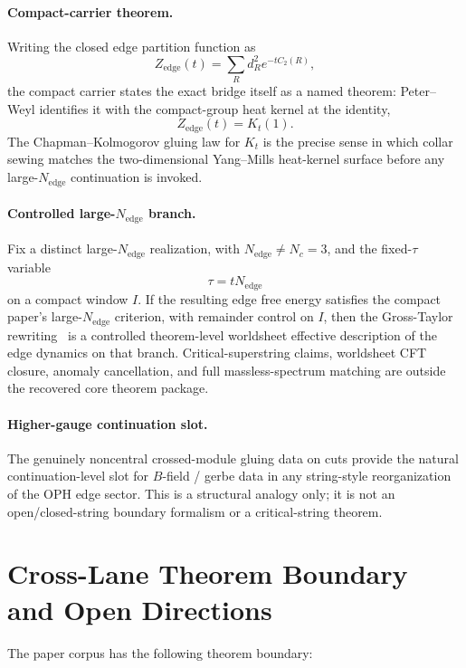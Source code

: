 \paragraph{Compact-carrier theorem.}
Writing the closed edge partition function as
\[
Z_{\mathrm{edge}}(t)=\sum_R d_R^2 e^{-tC_2(R)},
\]
the compact carrier states the exact bridge itself as a named theorem: Peter--Weyl identifies it with the compact-group heat kernel at the identity,
\[
Z_{\mathrm{edge}}(t)=K_t(1).
\]
The Chapman--Kolmogorov gluing law for \(K_t\) is the precise sense in which collar sewing
matches the two-dimensional Yang--Mills heat-kernel surface before any large-\(N_{\mathrm{edge}}\)
continuation is invoked.

\paragraph{Controlled large-\(N_{\mathrm{edge}}\) branch.}
Fix a distinct large-\(N_{\mathrm{edge}}\) realization, with \(N_{\mathrm{edge}}\neq N_c=3\), and
the fixed-\(\tau\) variable
\[
\tau=tN_{\mathrm{edge}}
\]
on a compact window \(I\). If the resulting edge free energy satisfies the compact paper's
large-\(N_{\mathrm{edge}}\) criterion, with remainder control on \(I\), then the Gross-Taylor
rewriting~\cite{grossTaylor93} is a controlled theorem-level worldsheet effective description of
the edge dynamics on that branch. Critical-superstring claims, worldsheet CFT closure, anomaly
cancellation, and full massless-spectrum matching are outside the recovered core theorem package.

\paragraph{Higher-gauge continuation slot.}
The genuinely noncentral crossed-module gluing data on cuts provide the natural continuation-level
slot for \(B\)-field / gerbe data in any string-style reorganization of the OPH edge sector. This
is a structural analogy only; it is not an open/closed-string boundary formalism or a
critical-string theorem.

\section{Cross-Lane Theorem Boundary and Open Directions}

The paper corpus has the following theorem boundary:


